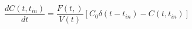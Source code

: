 \begin{equation}
\frac{dC(t,t_{in})}{dt} = \frac{F(t,)}{V(t)}[C_0\delta(t-t_{in})-C(t,t_{in})]
\end{equation}